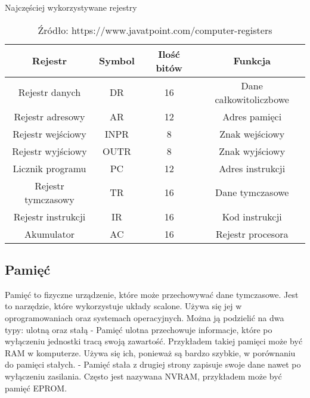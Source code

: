 \documentclass[12pt, a4paper, onside, polish]{article}				%
\begin{document}
\begin{table}[H]
\caption{Najczęściej wykorzystywane rejestry}
\caption*{Źródło: https://www.javatpoint.com/computer-registers}
\centering
\begin{tabular}{|c|c|c|c|}
\hline
\textbf{Rejestr}   & \textbf{Symbol} & \textbf{Ilość bitów} & \textbf{Funkcja}       \\ \hline
Rejestr danych     & DR              & 16                   & Dane całkowitoliczbowe \\ \hline
Rejestr adresowy   & AR              & 12                   & Adres pamięci          \\ \hline
Rejestr wejściowy  & INPR            & 8                    & Znak wejściowy         \\ \hline
Rejestr wyjściowy  & OUTR            & 8                    & Znak wyjściowy         \\ \hline
Licznik programu   & PC              & 12                   & Adres instrukcji       \\ \hline
Rejestr tymczasowy & TR              & 16                   & Dane tymczasowe        \\ \hline
Rejestr instrukcji & IR              & 16                   & Kod instrukcji         \\ \hline
Akumulator         & AC              & 16                   & Rejestr procesora      \\ \hline
\end{tabular}
\end{table}



\subsection{Pamięć}
\hspace{\parindent}
Pamięć to fizyczne urządzenie, które może przechowywać dane tymczasowe. Jest to narzędzie, które wykorzystuje układy scalone. Używa się jej w oprogramowaniach oraz systemach operacyjnych. Można ją podzielić na dwa typy: ulotną oraz stałą \newline  \newline
- Pamięć ulotna przechowuje informacje, które po wyłączeniu jednostki tracą swoją zawartość. Przykładem takiej pamięci może być RAM w komputerze. Używa się ich, ponieważ są bardzo szybkie, w porównaniu do pamięci stałych.  \newline
-  Pamięć stała z drugiej strony zapisuje swoje dane nawet po wyłączeniu zasilania. Często jest nazywana NVRAM, przykładem może być pamięć EPROM.  \newline
\end{document}
